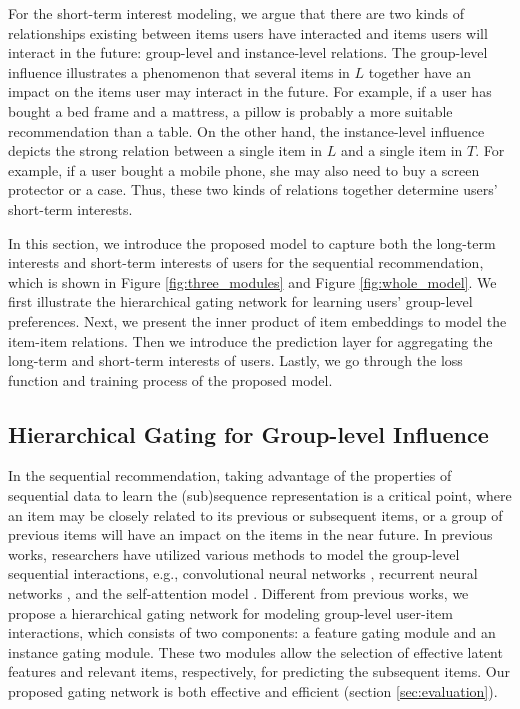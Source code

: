 \documentclass[sigconf]{acmart}
\begin{document}
For the short-term interest modeling, we argue that there are two kinds of relationships existing between items users have interacted and items users will interact in the future: group-level and instance-level relations. The group-level influence illustrates a phenomenon that several items in $ L $ together have an impact on the items user may interact in the future. For example, if a user has bought a bed frame and a mattress, a pillow is probably a more suitable recommendation than a table. On the other hand, the instance-level influence depicts the strong relation between a single item in $ L $ and a single item in $ T $. For example, if a user bought a mobile phone, she may also need to buy a screen protector or a case. Thus, these two kinds of relations together determine users' short-term interests.

In this section, we introduce the proposed model to capture both the long-term interests and short-term interests of users for the sequential recommendation, which is shown in Figure \ref{fig:three_modules} and Figure \ref{fig:whole_model}. We first illustrate the hierarchical gating network for learning users' group-level preferences. Next, we present the inner product of item embeddings to model the item-item relations. Then we introduce the prediction layer for aggregating the long-term and short-term interests of users. Lastly, we go through the loss function and training process of the proposed model. 

\subsection{Hierarchical Gating for Group-level Influence}
In the sequential recommendation, taking advantage of the properties of sequential data to learn the (sub)sequence representation is a critical point, where an item may be closely related to its previous or subsequent items, or a group of previous items will have an impact on the items in the near future. In previous works, researchers have utilized various methods to model the group-level sequential interactions, e.g., convolutional neural networks \cite{DBLP:conf/wsdm/TangW18}, recurrent neural networks \cite{DBLP:journals/corr/HidasiKBT15,DBLP:conf/cikm/PeiYSZBT17,DBLP:conf/recsys/QuadranaKHC17,DBLP:conf/cikm/HidasiK18}, and the self-attention model \cite{DBLP:conf/icdm/KangM18}. Different from previous works, we propose a hierarchical gating network for modeling group-level user-item interactions, which consists of two components: a feature gating module and an instance gating module. These two modules allow the selection of effective latent features and relevant items, respectively, for predicting the subsequent items. Our proposed gating network is both effective and efficient (section \ref{sec:evaluation}).
\end{document}
